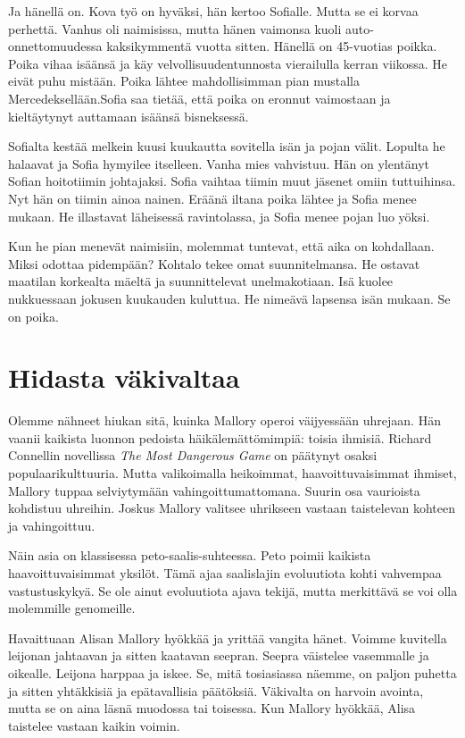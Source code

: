 \begin{tarina}
Ja hänellä on. Kova työ on hyväksi, hän kertoo Sofialle. Mutta se ei korvaa perhettä. Vanhus oli naimisissa, mutta hänen vaimonsa kuoli auto-onnettomuudessa kaksikymmentä vuotta sitten. Hänellä on 45-vuotias poikka. Poika vihaa isäänsä ja käy velvollisuudentunnosta vierailulla kerran viikossa. He eivät puhu mistään. Poika lähtee mahdollisimman pian mustalla Mercedeksellään.Sofia saa tietää, että poika on eronnut vaimostaan ja kieltäytynyt auttamaan isäänsä bisneksessä.

Sofialta kestää melkein kuusi kuukautta sovitella isän ja pojan välit. Lopulta he halaavat ja Sofia hymyilee itselleen. Vanha mies vahvistuu. Hän on ylentänyt Sofian hoitotiimin johtajaksi. Sofia vaihtaa tiimin muut jäsenet omiin tuttuihinsa. Nyt hän on tiimin ainoa nainen. Eräänä iltana poika lähtee ja Sofia menee mukaan. He illastavat läheisessä ravintolassa, ja Sofia menee pojan luo yöksi.

Kun he pian menevät naimisiin, molemmat tuntevat, että aika on kohdallaan. Miksi odottaa pidempään? Kohtalo tekee omat suunnitelmansa. He ostavat maatilan korkealta mäeltä ja suunnittelevat unelmakotiaan. Isä kuolee nukkuessaan jokusen kuukauden kuluttua. He nimeävä lapsensa isän mukaan. Se on poika.
\end{tarina}

\section{Hidasta väkivaltaa}

Olemme nähneet hiukan sitä, kuinka Mallory operoi väijyessään uhrejaan. Hän vaanii kaikista luonnon pedoista häikälemättömimpiä: toisia ihmisiä. Richard Connellin novellissa \emph{The Most Dangerous Game} on päätynyt osaksi populaarikulttuuria. Mutta valikoimalla heikoimmat, haavoittuvaisimmat ihmiset, Mallory tuppaa selviytymään vahingoittumattomana. Suurin osa vaurioista kohdistuu uhreihin. Joskus Mallory valitsee uhrikseen vastaan taistelevan kohteen ja vahingoittuu.

Näin asia on klassisessa peto-saalis-suhteessa. Peto poimii kaikista haavoittuvaisimmat yksilöt. Tämä ajaa saalislajin evoluutiota kohti vahvempaa vastustuskykyä. Se ole ainut evoluutiota ajava tekijä, mutta merkittävä se voi olla molemmille genomeille.

Havaittuaan Alisan Mallory hyökkää ja yrittää vangita hänet. Voimme kuvitella leijonan jahtaavan ja sitten kaatavan seepran. Seepra väistelee vasemmalle ja oikealle. Leijona harppaa ja iskee. Se, mitä tosiasiassa näemme, on paljon puhetta ja sitten yhtäkkisiä ja epätavallisia päätöksiä. Väkivalta on harvoin avointa, mutta se on aina läsnä muodossa tai toisessa. Kun Mallory hyökkää, Alisa taistelee vastaan kaikin voimin.

